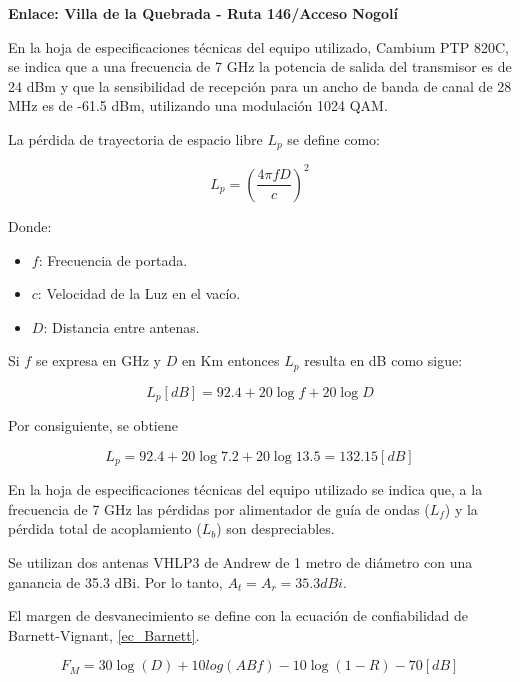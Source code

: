 \documentclass[12pt,a4paper]{book}
\begin{document}
\noindent\textbf{Enlace: Villa de la Quebrada - Ruta 146/Acceso Nogolí}

En la hoja de especificaciones técnicas del equipo utilizado, Cambium PTP 820C, se indica que a una frecuencia de 7 GHz la potencia de salida del transmisor es de 24 dBm y que la sensibilidad de recepción para un ancho de banda de canal de 28 MHz es de -61.5 dBm, utilizando una modulación 1024 QAM.

La pérdida de trayectoria de espacio libre $L_{p}$ se define como:

\begin{equation}\label{Perdida_tratectoria}
L_{p}=(\frac{4 \pi f D }{c})^{2}
\end{equation}

Donde:

\begin{itemize}
\item $f$: Frecuencia de portada.
\item $c$: Velocidad de la Luz en el vacío.
\item $D$: Distancia entre antenas.
\end{itemize}

Si $f$ se expresa en GHz y $D$ en Km entonces $L_{p}$ resulta en dB como sigue:

\begin{equation}\label{perdida_trayectoria_db}
L_{p}[dB]=92.4 + 20 \log{f} + 20 \log{D}
\end{equation}

Por consiguiente, se obtiene

\begin{equation}\label{perdida_trayectoria_db_resultado}
L_{p} =92.4 + 20 \log{7.2} + 20 \log{13.5} = 132.15 [dB]
\end{equation}

En la hoja de especificaciones técnicas del equipo utilizado se indica que, a la frecuencia de 7 GHz las pérdidas por alimentador de guía de ondas ($L_{f}$) y la pérdida total de acoplamiento ($L_{b}$) son despreciables.

Se utilizan dos antenas VHLP3 de Andrew de 1 metro de diámetro con una ganancia de 35.3 dBi. Por lo tanto, $A_{t}=A_{r}= 35.3 dBi$.

El margen de desvanecimiento se define con la ecuación de confiabilidad de Barnett-Vignant, \ref{ec_Barnett}.

\begin{equation}\label{ec_Barnett}
F_{M}= 30 \log(D) + 10 log(ABf)- 10 \log(1-R) - 70 [dB]
\end{equation}
\end{document}
